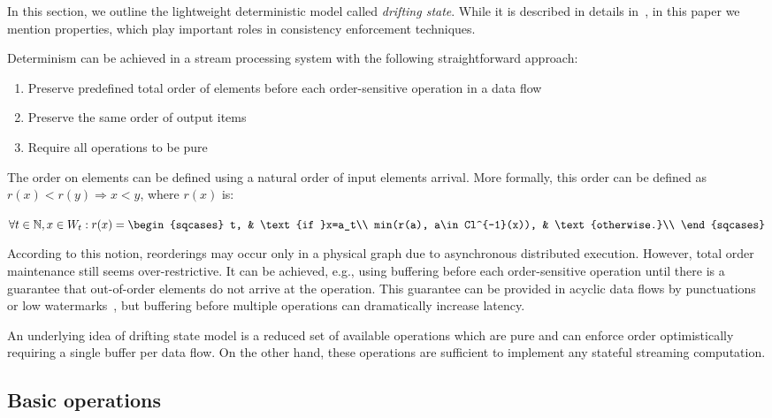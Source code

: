 
\label {fs-model-section}

In this section, we outline the lightweight deterministic model called {\em drifting state}. While it is described in details in~\cite{we2018adbis}, in this paper we mention properties, which play important roles in consistency enforcement techniques.

Determinism can be achieved in a stream processing system with the following straightforward approach:
\begin{enumerate}
    \item Preserve predefined total order of elements before each order-sensitive operation in a data flow
    \item Preserve the same order of output items
    \item Require all operations to be pure
\end{enumerate}

The order on elements can be defined using a natural order of input elements arrival. More formally, this order can be defined as $r(x) < r(y) \Rightarrow x < y$, where $r(x)$ is:

$\forall{t\in{\mathbb{N}}, x\in{W_t}} : r(x)=\begin{sqcases}
t, & \text{if }x=a_t\\
min(r(a), a\in Cl^{-1}(x)), & \text{otherwise.}\\
\end{sqcases}$

According to this notion, reorderings may occur only in a physical graph due to asynchronous distributed execution. However, total order maintenance still seems over-restrictive. It can be achieved, e.g., using buffering before each order-sensitive operation until there is a guarantee that out-of-order elements do not arrive at the operation. This guarantee can be provided in acyclic data flows by punctuations or low watermarks~\cite{Li:2008:OPN:1453856.1453890}, but buffering before multiple operations can dramatically increase latency.

An underlying idea of drifting state model is a reduced set of available operations which are pure and can enforce order optimistically requiring a single buffer per data flow. On the other hand, these operations are sufficient to implement any stateful streaming computation. 
\subsection{Basic operations}

